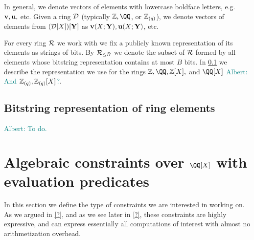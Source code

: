 \documentclass[11pt,letterpaper,usenames,dvipsnames]{article}
\newcommand{\albert}[1]{\textcolor{teal}{Albert: {#1}}}
\begin{document}
In general, we denote vectors of elements with lowercase boldface letters, e.g.\ $\mathbf{v},\mathbf{u},$ etc. Given a ring $\mathcal{D}$ (typically $\ZZ, \QQ$, or $\mathbb{Z}_{(q)}$), we denote vectors of elements from $(\mathcal{D}[X])[\mathbf{Y}]$ as $\mathbf{v}(X;\mathbf{Y}), \mathbf{u}(X;\mathbf{Y})$, etc.


For every ring $\mathcal{R}$ we work with we fix a publicly known representation of its elements as strings of bits. By $\mathcal{R}_{\leq B}$ we denote the subset of $\mathcal{R}$ formed by all elements whose bitstring representation contains at most $B$ bits. In \cref{s: bistring_reps} we describe the representation we use for the rings $\ZZ,\QQ, \ZZ[X],$ and $\QQ[X]$ \albert{And $\mathbb{Z}_{(q)},\mathbb{Z}_{(q)}[X]$?}.

\subsection{Bitstring representation of ring elements}\label{s: bistring_reps}
\albert{To do.}

\section{Algebraic constraints over $\QQ[X]$ with evaluation predicates}

In this section we define the type of constraints we are interested in working on. As we argued in \cref{?}, and as we see later in \cref{?}, these constraints are highly expressive, and can  express essentially all computations of interest with almost no arithmetization overhead.

\newcommand{\evalconstraints}{\text{\emph{Eval}}}
\newcommand{\mainQpolyring}{(\QQ[X]_{\leq B})}
\end{document}
